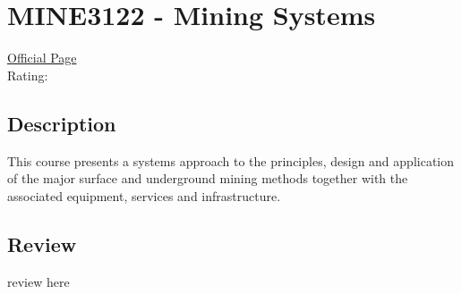 \hypertarget{MINE3122}{\section{MINE3122 - Mining Systems}}

\large
\textcolor{turbo_purple}{\href{https://my.uq.edu.au/programs-courses/course.html?course_code=MINE3122}{Official Page}} \\
Rating: \cstar\cstar\cstar\cstar\ostar

\normalsize
\subsection*{Description}
This course presents a systems approach to the principles, design and application of the major surface and underground mining methods together with the associated equipment, services and infrastructure.

\subsection*{Review}
review here
